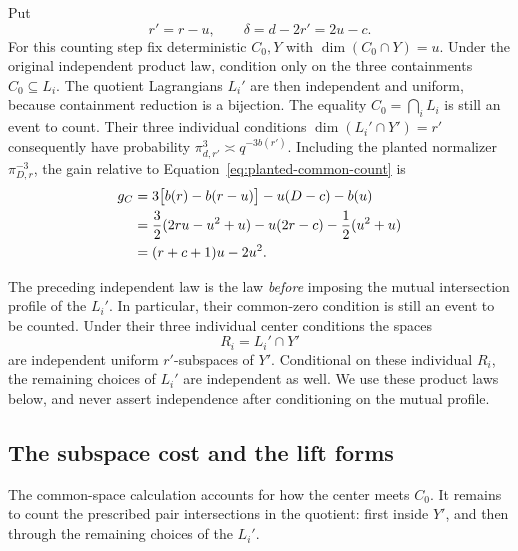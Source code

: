 Put
\begin{equation}\label{eq:planted-reduced-parameters}
 r'=r-u,\qquad \delta=d-2r'=2u-c.
\end{equation}
For this counting step fix deterministic $C_0,Y$ with
$\dim(C_0\cap Y)=u$.  Under the original independent product law,
condition only on the three containments $C_0\subseteq L_i$.
The quotient Lagrangians $L_i'$ are then independent and uniform,
because containment reduction is a bijection.  The equality
$C_0=\bigcap_i L_i$ is still an event to count.  Their three
individual conditions $\dim(L_i'\cap Y')=r'$ consequently have
probability $\pi_{d,r'}^3\asymp q^{-3b(r')}$.  Including the planted
normalizer $\pi_{D,r}^{-3}$, the gain relative to
Equation~\eqref{eq:planted-common-count} is
\begin{align}
 g_C
 &=3\bigl[b(r)-b(r-u)\bigr]-u(D-c)-b(u) \notag\\
 &=\frac32(2ru-u^2+u)-u(2r-c)-\frac12(u^2+u)
      \notag\\
 &=(r+c+1)u-2u^2.
 \label{eq:planted-common-gain}
\end{align}

The preceding independent law is the law \emph{before} imposing the
mutual intersection profile of the $L_i'$.  In particular, their
common-zero condition is still an event to be counted.  Under their
three individual center conditions the spaces
\[
 R_i=L_i'\cap Y'
\]
are independent uniform $r'$-subspaces of $Y'$.  Conditional on these
individual $R_i$, the remaining choices of $L_i'$ are independent as
well.  We use these product laws below, and never assert independence
after conditioning on the mutual profile.

\subsection{The subspace cost and the lift forms}

The common-space calculation accounts for how the center meets $C_0$.
It remains to count the prescribed pair intersections in the quotient:
first inside $Y'$, and then through the remaining choices of the $L_i'$.

